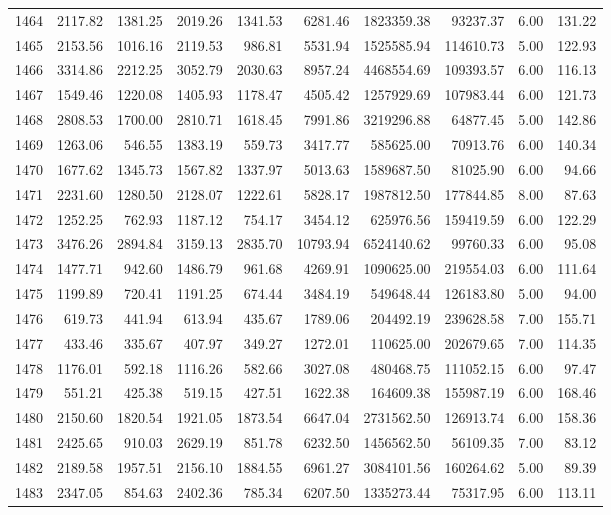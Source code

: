\begin{tabular}{lrrrrrrrrr}
1464 & 2117.82 & 1381.25 & 2019.26 & 1341.53 & 6281.46 & 1823359.38 & 93237.37 & 6.00 & 131.22 \\
1465 & 2153.56 & 1016.16 & 2119.53 & 986.81 & 5531.94 & 1525585.94 & 114610.73 & 5.00 & 122.93 \\
1466 & 3314.86 & 2212.25 & 3052.79 & 2030.63 & 8957.24 & 4468554.69 & 109393.57 & 6.00 & 116.13 \\
1467 & 1549.46 & 1220.08 & 1405.93 & 1178.47 & 4505.42 & 1257929.69 & 107983.44 & 6.00 & 121.73 \\
1468 & 2808.53 & 1700.00 & 2810.71 & 1618.45 & 7991.86 & 3219296.88 & 64877.45 & 5.00 & 142.86 \\
1469 & 1263.06 & 546.55 & 1383.19 & 559.73 & 3417.77 & 585625.00 & 70913.76 & 6.00 & 140.34 \\
1470 & 1677.62 & 1345.73 & 1567.82 & 1337.97 & 5013.63 & 1589687.50 & 81025.90 & 6.00 & 94.66 \\
1471 & 2231.60 & 1280.50 & 2128.07 & 1222.61 & 5828.17 & 1987812.50 & 177844.85 & 8.00 & 87.63 \\
1472 & 1252.25 & 762.93 & 1187.12 & 754.17 & 3454.12 & 625976.56 & 159419.59 & 6.00 & 122.29 \\
1473 & 3476.26 & 2894.84 & 3159.13 & 2835.70 & 10793.94 & 6524140.62 & 99760.33 & 6.00 & 95.08 \\
1474 & 1477.71 & 942.60 & 1486.79 & 961.68 & 4269.91 & 1090625.00 & 219554.03 & 6.00 & 111.64 \\
1475 & 1199.89 & 720.41 & 1191.25 & 674.44 & 3484.19 & 549648.44 & 126183.80 & 5.00 & 94.00 \\
1476 & 619.73 & 441.94 & 613.94 & 435.67 & 1789.06 & 204492.19 & 239628.58 & 7.00 & 155.71 \\
1477 & 433.46 & 335.67 & 407.97 & 349.27 & 1272.01 & 110625.00 & 202679.65 & 7.00 & 114.35 \\
1478 & 1176.01 & 592.18 & 1116.26 & 582.66 & 3027.08 & 480468.75 & 111052.15 & 6.00 & 97.47 \\
1479 & 551.21 & 425.38 & 519.15 & 427.51 & 1622.38 & 164609.38 & 155987.19 & 6.00 & 168.46 \\
1480 & 2150.60 & 1820.54 & 1921.05 & 1873.54 & 6647.04 & 2731562.50 & 126913.74 & 6.00 & 158.36 \\
1481 & 2425.65 & 910.03 & 2629.19 & 851.78 & 6232.50 & 1456562.50 & 56109.35 & 7.00 & 83.12 \\
1482 & 2189.58 & 1957.51 & 2156.10 & 1884.55 & 6961.27 & 3084101.56 & 160264.62 & 5.00 & 89.39 \\
1483 & 2347.05 & 854.63 & 2402.36 & 785.34 & 6207.50 & 1335273.44 & 75317.95 & 6.00 & 113.11 \\

\end{tabular}
